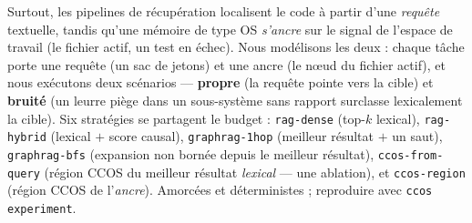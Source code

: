 \documentclass[11pt]{article}
\newcommand{\code}[1]{\texttt{#1}}
\begin{document}
Surtout, les pipelines de récupération localisent le code à partir d'une
\emph{requête} textuelle, tandis qu'une mémoire de type OS \emph{s'ancre} sur le
signal de l'espace de travail (le fichier actif, un test en échec). Nous modélisons les
deux : chaque tâche porte une requête (un sac de jetons) et une ancre (le nœud du
fichier actif), et nous exécutons deux scénarios --- \textbf{propre} (la requête pointe
vers la cible) et \textbf{bruité} (un leurre piège dans un sous-système sans rapport
surclasse lexicalement la cible). Six stratégies se partagent le budget :
\code{rag-dense} (top-$k$ lexical), \code{rag-hybrid} (lexical $+$ score causal),
\code{graphrag-1hop} (meilleur résultat $+$ un saut), \code{graphrag-bfs} (expansion
non bornée depuis le meilleur résultat), \code{ccos-from-query} (région CCOS du
meilleur résultat \emph{lexical} --- une ablation), et \code{ccos-region} (région CCOS
de l'\emph{ancre}). Amorcées et déterministes ; reproduire avec \code{ccos
experiment}.
\end{document}

